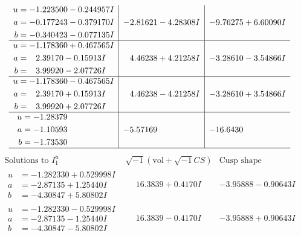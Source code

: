 \documentclass[1p]{elsarticle_modified}
\theoremstyle{definition}
\newcommand{\I}{\sqrt{-1}}
\begin{document}
$$\begin{array}{c|c|c}
\begin{aligned}
u &= -1.223500 - 0.244957 I \\
a &= -0.177243 - 0.379170 I \\
b &= -0.340423 - 0.077135 I\end{aligned}
 & -2.81621 - 4.28308 I & -9.76275 + 6.60090 I \\ \hline\begin{aligned}
u &= -1.178360 + 0.467565 I \\
a &= \phantom{-}2.39170 - 0.15913 I \\
b &= \phantom{-}3.99920 - 2.07726 I\end{aligned}
 & \phantom{-}4.46238 + 4.21258 I & -3.28610 - 3.54866 I \\ \hline\begin{aligned}
u &= -1.178360 - 0.467565 I \\
a &= \phantom{-}2.39170 + 0.15913 I \\
b &= \phantom{-}3.99920 + 2.07726 I\end{aligned}
 & \phantom{-}4.46238 - 4.21258 I & -3.28610 + 3.54866 I \\ \hline\begin{aligned}
u &= -1.28379\phantom{ +0.000000I} \\
a &= -1.10593\phantom{ +0.000000I} \\
b &= -1.73530\phantom{ +0.000000I}\end{aligned}
 & -5.57169\phantom{ +0.000000I} & -16.6430\phantom{ +0.000000I}\\
 \hline 
 \end{array}$$\newpage$$\begin{array}{c|c|c}  
\text{Solutions to }I^u_{1}& \I (\text{vol} + \sqrt{-1}CS) & \text{Cusp shape}\\
 \hline 
\begin{aligned}
u &= -1.282330 + 0.529998 I \\
a &= -2.87135 + 1.25440 I \\
b &= -4.30847 + 5.80802 I\end{aligned}
 & \phantom{-}16.3839 + 0.4170 I & -3.95888 - 0.90643 I \\ \hline\begin{aligned}
u &= -1.282330 - 0.529998 I \\
a &= -2.87135 - 1.25440 I \\
b &= -4.30847 - 5.80802 I\end{aligned}
 & \phantom{-}16.3839 - 0.4170 I & -3.95888 + 0.90643 I \\ \hline\begin{aligned}

\end{aligned}
\end{array}$$
\end{document}
